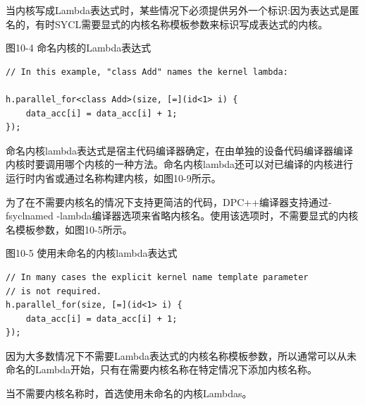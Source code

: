 当内核写成Lambda表达式时，某些情况下必须提供另外一个标识:因为表达式是匿名的，有时SYCL需要显式的内核名称模板参数来标识写成表达式的内核。\par

\hspace*{\fill} \par %
图10-4 命名内核的Lambda表达式
\begin{lstlisting}[caption={}]
// In this example, "class Add" names the kernel lambda:

h.parallel_for<class Add>(size, [=](id<1> i) {
	data_acc[i] = data_acc[i] + 1;
});
\end{lstlisting}

命名内核lambda表达式是宿主代码编译器确定，在由单独的设备代码编译器编译内核时要调用哪个内核的一种方法。命名内核lambda还可以对已编译的内核进行运行时内省或通过名称构建内核，如图10-9所示。\par

为了在不需要内核名的情况下支持更简洁的代码，DPC++编译器支持通过-fsyclnamed -lambda编译器选项来省略内核名。使用该选项时，不需要显式的内核名模板参数，如图10-5所示。\par

\hspace*{\fill} \par %
图10-5 使用未命名的内核lambda表达式
\begin{lstlisting}[caption={}]
// In many cases the explicit kernel name template parameter
// is not required.
h.parallel_for(size, [=](id<1> i) {
	data_acc[i] = data_acc[i] + 1;
});
\end{lstlisting}

因为大多数情况下不需要Lambda表达式的内核名称模板参数，所以通常可以从未命名的Lambda开始，只有在需要内核名称在特定情况下添加内核名称。\par

\begin{tcolorbox}[colback=red!5!white,colframe=red!75!black]
当不需要内核名称时，首选使用未命名的内核Lambdas。
\end{tcolorbox}



















